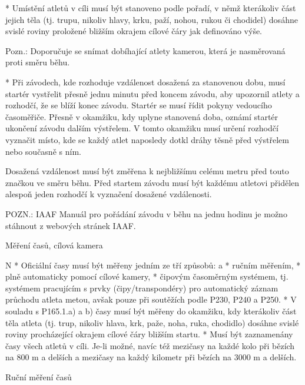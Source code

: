* Umístění atletů v cíli musí být stanoveno podle pořadí, v němž kterákoliv část jejich těla (tj. trupu, nikoliv hlavy, krku, paží, nohou, rukou či chodidel) dosáhne svislé roviny proložené bližším okrajem cílové čáry jak definováno výše.

Pozn.: Doporučuje se snímat dobíhající atlety kamerou, která je nasměrovaná proti směru běhu.

* Při závodech, kde rozhoduje vzdálenost dosažená za stanovenou dobu, musí startér vystřelit přesně jednu minutu před koncem závodu, aby upozornil atlety a rozhodčí, že se blíží konec závodu. Startér se musí řídit pokyny vedoucího časoměřiče. Přesně v okamžiku, kdy uplyne stanovená doba, oznámí startér ukončení závodu dalším výstřelem. V tomto okamžiku musí určení rozhodčí vyznačit místo, kde se každý atlet naposledy dotkl dráhy těsně před výstřelem nebo současně s ním.

Dosažená vzdálenost musí být změřena k nejbližšímu celému metru před touto značkou ve směru běhu. Před startem závodu musí být každému atletovi přidělen alespoň jeden rozhodčí k vyznačení dosažené vzdálenosti.

POZN.: IAAF Manuál pro pořádání závodu v běhu na jednu hodinu je možno stáhnout z webových stránek IAAF.
\enditems

\secc Měření časů, cílová kamera

\begitems \style N
* Oficiální časy musí být měřeny jedním ze tří způsobů:
  \begitems \style a
  * ručním měřením,
  * plně automaticky pomocí cílové kamery,
  * čipovým časoměrným systémem, tj. systémem pracujícím s prvky (čipy/transpondéry) pro automatický záznam průchodu atleta metou, avšak pouze při soutěžích podle P230, P240 a P250.
  \enditems
* V souladu s P165.1.a) a b) časy musí být měřeny do okamžiku, kdy kterákoliv část těla atleta (tj. trup, nikoliv hlava, krk, paže, noha, ruka, chodidlo) dosáhne svislé roviny procházející okrajem cílové čáry bližším startu.
* Musí být zaznamenány časy všech atletů v cíli. Je-li možné, navíc též mezičasy na každé kolo při bězích na 800 m a delších a mezičasy na každý kilometr při bězích na 3000 m a delších.

Ruční měření časů

